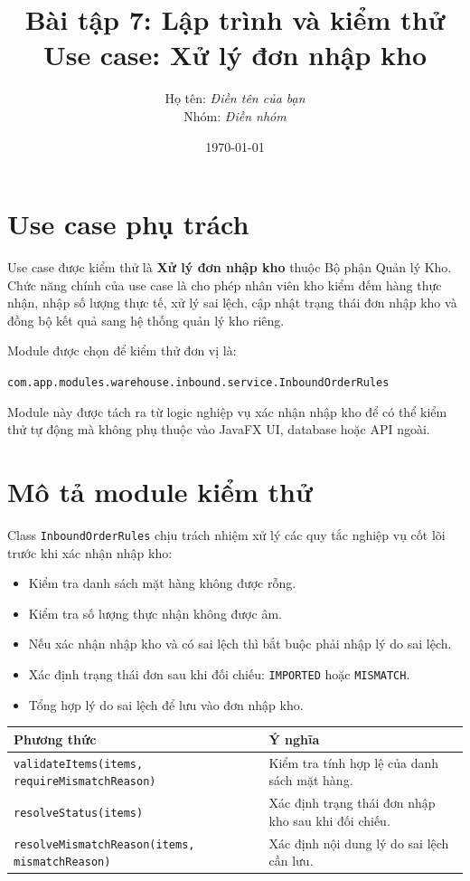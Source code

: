 \documentclass[12pt,a4paper]{article}
\title{\textbf{Bài tập 7: Lập trình và kiểm thử}\\
Use case: Xử lý đơn nhập kho}
\author{Họ tên: \textit{Điền tên của bạn}\\
Nhóm: \textit{Điền nhóm}}
\date{\today}
\begin{document}
\maketitle

\section{Use case phụ trách}

Use case được kiểm thử là \textbf{Xử lý đơn nhập kho} thuộc Bộ phận Quản lý Kho.
Chức năng chính của use case là cho phép nhân viên kho kiểm đếm hàng thực nhận, nhập số lượng thực tế, xử lý sai lệch, cập nhật trạng thái đơn nhập kho và đồng bộ kết quả sang hệ thống quản lý kho riêng.

Module được chọn để kiểm thử đơn vị là:

\begin{center}
\texttt{com.app.modules.warehouse.inbound.service.InboundOrderRules}
\end{center}

Module này được tách ra từ logic nghiệp vụ xác nhận nhập kho để có thể kiểm thử tự động mà không phụ thuộc vào JavaFX UI, database hoặc API ngoài.

\section{Mô tả module kiểm thử}

Class \texttt{InboundOrderRules} chịu trách nhiệm xử lý các quy tắc nghiệp vụ cốt lõi trước khi xác nhận nhập kho:

\begin{itemize}[leftmargin=1.2cm]
    \item Kiểm tra danh sách mặt hàng không được rỗng.
    \item Kiểm tra số lượng thực nhận không được âm.
    \item Nếu xác nhận nhập kho và có sai lệch thì bắt buộc phải nhập lý do sai lệch.
    \item Xác định trạng thái đơn sau khi đối chiếu: \texttt{IMPORTED} hoặc \texttt{MISMATCH}.
    \item Tổng hợp lý do sai lệch để lưu vào đơn nhập kho.
\end{itemize}

\begin{longtable}{|p{6cm}|p{8cm}|}
\hline
\textbf{Phương thức} & \textbf{Ý nghĩa} \\
\hline
\texttt{validateItems(items, requireMismatchReason)} & Kiểm tra tính hợp lệ của danh sách mặt hàng. \\
\hline
\texttt{resolveStatus(items)} & Xác định trạng thái đơn nhập kho sau khi đối chiếu. \\
\hline
\texttt{resolveMismatchReason(items, mismatchReason)} & Xác định nội dung lý do sai lệch cần lưu. \\
\hline
\end{longtable}
\end{document}
